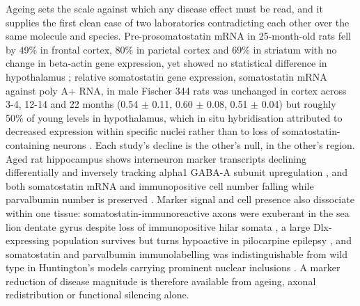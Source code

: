 \documentclass[11pt]{article}
\begin{document}
Ageing sets the scale against which any disease effect must be read, and it supplies the first clean case of two laboratories contradicting each other over the same molecule and species. Pre-prosomatostatin mRNA in 25-month-old rats fell by 49\% in frontal cortex, 80\% in parietal cortex and 69\% in striatum with no change in beta-actin gene expression, yet showed no statistical difference in hypothalamus \citep{Florio1991}; relative somatostatin gene expression, somatostatin mRNA against poly A+ RNA, in male Fischer 344 rats was unchanged in cortex across 3-4, 12-14 and 22 months (0.54 $\pm$ 0.11, 0.60 $\pm$ 0.08, 0.51 $\pm$ 0.04) but roughly 50\% of young levels in hypothalamus, which in situ hybridisation attributed to decreased expression within specific nuclei rather than to loss of somatostatin-containing neurons \citep{SONNTAG1990}. Each study's decline is the other's null, in the other's region. Aged rat hippocampus shows interneuron marker transcripts declining differentially and inversely tracking alpha1 GABA-A subunit upregulation \citep{Vela2003}, and both somatostatin mRNA and immunopositive cell number falling while parvalbumin number is preserved \citep{Gavilan2007}. Marker signal and cell presence also dissociate within one tissue: somatostatin-immunoreactive axons were exuberant in the sea lion dentate gyrus despite loss of immunopositive hilar somata \citep{Buckmaster2014}, a large Dlx-expressing population survives but turns hypoactive in pilocarpine epilepsy \citep{Matringhen2025}, and somatostatin and parvalbumin immunolabelling was indistinguishable from wild type in Huntington's models carrying prominent nuclear inclusions \citep{Menalled2000}. A marker reduction of disease magnitude is therefore available from ageing, axonal redistribution or functional silencing alone.
\end{document}
